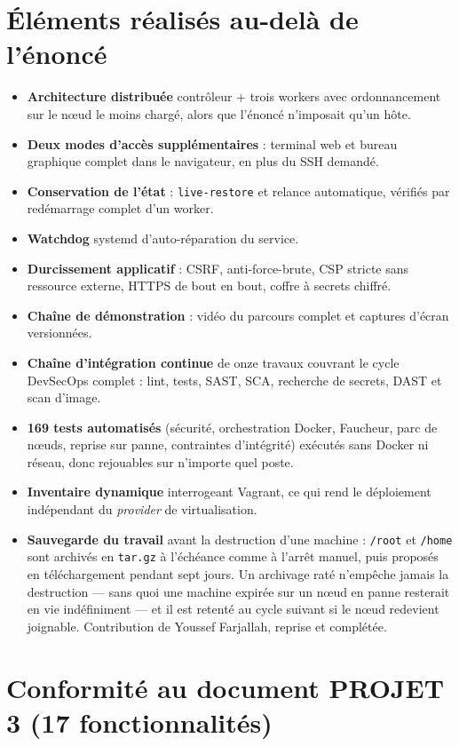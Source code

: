 \documentclass[11pt,a4paper]{article}
\begin{document}
\section{Éléments réalisés au-delà de l'énoncé}
\begin{itemize}
\item \textbf{Architecture distribuée} contrôleur + trois workers avec ordonnancement sur le n\oe{}ud le
moins chargé, alors que l'énoncé n'imposait qu'un hôte.
\item \textbf{Deux modes d'accès supplémentaires} : terminal web et bureau graphique complet dans le
navigateur, en plus du SSH demandé.
\item \textbf{Conservation de l'état} : \texttt{live-restore} et relance automatique, vérifiés par
redémarrage complet d'un worker.
\item \textbf{Watchdog} systemd d'auto-réparation du service.
\item \textbf{Durcissement applicatif} : CSRF, anti-force-brute, CSP stricte sans ressource externe,
HTTPS de bout en bout, coffre à secrets chiffré.
\item \textbf{Chaîne de démonstration} : vidéo du parcours complet et captures d'écran versionnées.
\item \textbf{Chaîne d'intégration continue} de onze travaux couvrant le cycle DevSecOps complet :
lint, tests, SAST, SCA, recherche de secrets, DAST et scan d'image.
\item \textbf{169 tests automatisés} (sécurité, orchestration Docker, Faucheur, parc de n\oe{}uds, reprise sur panne, contraintes d'intégrité) exécutés sans Docker
ni réseau, donc rejouables sur n'importe quel poste.
\item \textbf{Inventaire dynamique} interrogeant Vagrant, ce qui rend le déploiement indépendant du
\emph{provider} de virtualisation.
\item \textbf{Sauvegarde du travail} avant la destruction d'une machine : \texttt{/root} et
\texttt{/home} sont archivés en \texttt{tar.gz} à l'échéance comme à l'arrêt manuel, puis
proposés en téléchargement pendant sept jours. Un archivage raté n'empêche jamais la
destruction --- sans quoi une machine expirée sur un n\oe{}ud en panne resterait en vie
indéfiniment --- et il est retenté au cycle suivant si le n\oe{}ud redevient joignable.
Contribution de Youssef Farjallah, reprise et complétée.
\end{itemize}

\section{Conformité au document \og{}PROJET 3\fg{} (17 fonctionnalités)}
\end{document}
